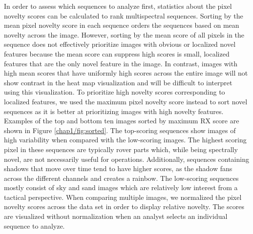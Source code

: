 In order to assess which sequences to analyze first, statistics about the pixel novelty scores can be calculated to rank multispectral sequences. 
Sorting by the mean pixel novelty score in each sequence orders the sequences based on mean novelty across the image.
However, sorting by the mean score of all pixels in the sequence does not effectively prioritize images with obvious or localized novel features because the mean score can suppress high scores is small, localized features that are the only novel feature in the image. 
In contrast, images with high mean scores that have uniformly high scores across the entire image will not show contrast in the heat map visualization and will be difficult to interpret using this visualization. 
To prioritize high novelty scores corresponding to localized features, we used the maximum pixel novelty score instead to sort novel sequences as it is better at prioritizing images with high novelty features. 
Examples of the top and bottom ten images sorted by maximum RX score are shown in Figure \ref{chap1/fig:sorted}. 
The top-scoring sequences show images of high variability when compared with the low-scoring images. 
The highest scoring pixel in these sequences are typically rover parts which, while being spectrally novel, are not necessarily useful for operations.
Additionally, sequences containing shadows that move over time tend to have higher scores, as the shadow fans across the different channels and creates a rainbow.
The low-scoring sequences mostly consist of sky and sand images which are relatively low interest from a tactical perspective. 
When comparing multiple images, we normalized the pixel novelty scores across the data set in order to display relative novelty. 
The scores are visualized without normalization when an analyst selects an individual sequence to analyze. 

